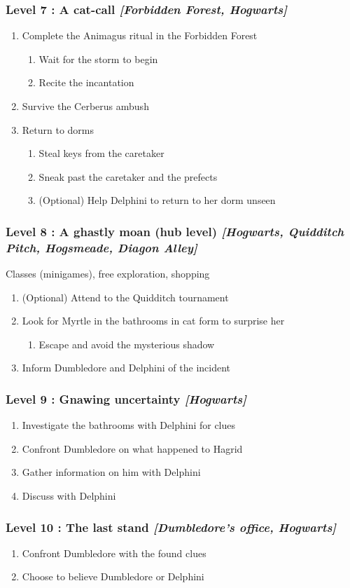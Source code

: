 \subsubsection*{Level 7 : A cat-call \textit{[Forbidden Forest, Hogwarts]}}
\begin{enumerate}[1)]
	\item Complete the Animagus ritual in the Forbidden Forest
	\begin{enumerate}[1.]
		\item Wait for the storm to begin
		\item Recite the incantation
	\end{enumerate}
	\item Survive the Cerberus ambush
	\item Return to dorms
	\begin{enumerate}[1.]
		\item Steal keys from the caretaker
		\item Sneak past the caretaker and the prefects
		\item (Optional) Help Delphini to return to her dorm unseen
	\end{enumerate}
\end{enumerate}

\subsubsection*{Level 8 : A ghastly moan (hub level) \textit{[Hogwarts, Quidditch Pitch, Hogsmeade, Diagon Alley]}}

Classes (minigames), free exploration, shopping

\begin{enumerate}[1)]
	\item (Optional) Attend to the Quidditch tournament
	\item Look for Myrtle in the bathrooms in cat form to surprise her
	\begin{enumerate}[1.]
		\item Escape and avoid the mysterious shadow
	\end{enumerate}
	\item Inform Dumbledore and Delphini of the incident
\end{enumerate}

\subsubsection*{Level 9 : Gnawing uncertainty \textit{[Hogwarts]}}
\begin{enumerate}[1)]
	\item Investigate the bathrooms with Delphini for clues
	\item Confront Dumbledore on what happened to Hagrid
	\item Gather information on him with Delphini
	\item Discuss with Delphini
\end{enumerate}

\subsubsection*{Level 10 : The last stand \textit{[Dumbledore's office, Hogwarts]}}
\begin{enumerate}[1)]
	\item Confront Dumbledore with the found clues
	\item Choose to believe Dumbledore or Delphini
\end{enumerate}

\pagebreak